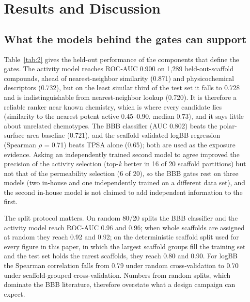 \documentclass[11pt,a4paper]{article}
\begin{document}
\section{Results and Discussion}
\label{sec:3}

\subsection{What the models behind the gates can support}
\label{sec:3.1}

Table~\ref{tab:2} gives the held-out performance of the components that define the gates. The activity model reaches ROC-AUC 0.900 on 1,289 held-out-scaffold compounds, ahead of nearest-neighbor similarity (0.871) and physicochemical descriptors (0.732), but on the least similar third of the test set it falls to 0.728 and is indistinguishable from nearest-neighbor lookup (0.720). It is therefore a reliable ranker near known chemistry, which is where every candidate lies (similarity to the nearest potent active 0.45--0.90, median 0.73), and it says little about unrelated chemotypes. The BBB classifier (AUC 0.802) beats the polar-surface-area baseline (0.721), and the scaffold-validated logBB regression (Spearman $\rho$ = 0.71) beats TPSA alone (0.65); both are used as the exposure evidence. Asking an independently trained second model to agree improved the precision of the activity selection (top-\textit{k} better in 16 of 20 scaffold partitions) but not that of the permeability selection (6 of 20), so the BBB gates rest on three models (two in-house and one independently trained on a different data set), and the second in-house model is not claimed to add independent information to the first.

The split protocol matters. On random 80/20 splits the BBB classifier and the activity model reach ROC-AUC 0.96 and 0.96; when whole scaffolds are assigned at random they reach 0.92 and 0.92; on the deterministic scaffold split used for every figure in this paper, in which the largest scaffold groups fill the training set and the test set holds the rarest scaffolds, they reach 0.80 and 0.90. For logBB the Spearman correlation falls from 0.79 under random cross-validation to 0.70 under scaffold-grouped cross-validation. Numbers from random splits, which dominate the BBB literature, therefore overstate what a design campaign can expect.
\end{document}
